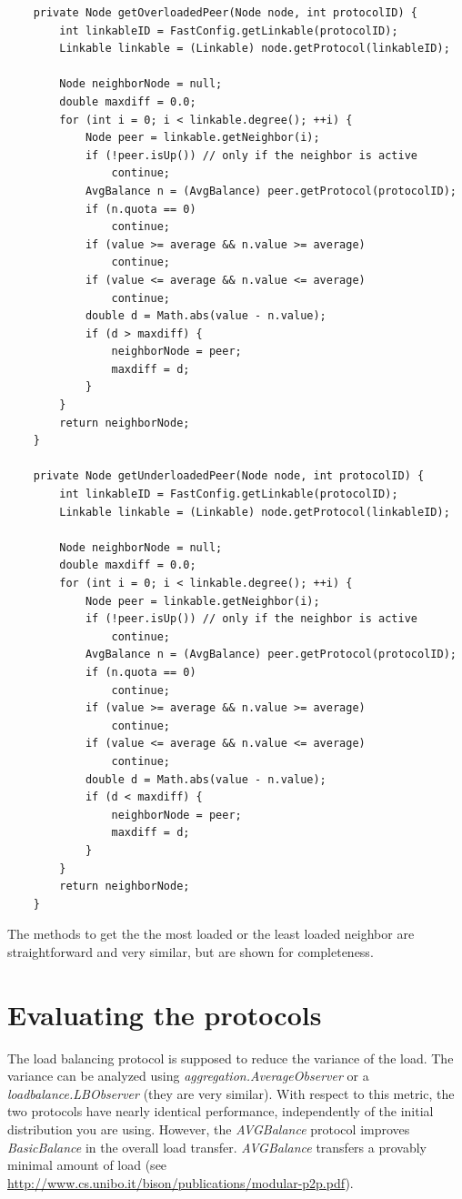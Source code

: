 \documentclass[a4paper,11pt]{article}
\begin{document}
\footnotesize
\begin{verbatim}
    private Node getOverloadedPeer(Node node, int protocolID) {
        int linkableID = FastConfig.getLinkable(protocolID);
        Linkable linkable = (Linkable) node.getProtocol(linkableID);

        Node neighborNode = null;
        double maxdiff = 0.0;
        for (int i = 0; i < linkable.degree(); ++i) {
            Node peer = linkable.getNeighbor(i);
            if (!peer.isUp()) // only if the neighbor is active
                continue;
            AvgBalance n = (AvgBalance) peer.getProtocol(protocolID);
            if (n.quota == 0)
                continue;
            if (value >= average && n.value >= average)
                continue;
            if (value <= average && n.value <= average)
                continue;
            double d = Math.abs(value - n.value);
            if (d > maxdiff) {
                neighborNode = peer;
                maxdiff = d;
            }
        }
        return neighborNode;
    }

    private Node getUnderloadedPeer(Node node, int protocolID) {
        int linkableID = FastConfig.getLinkable(protocolID);
        Linkable linkable = (Linkable) node.getProtocol(linkableID);

        Node neighborNode = null;
        double maxdiff = 0.0;
        for (int i = 0; i < linkable.degree(); ++i) {
            Node peer = linkable.getNeighbor(i);
            if (!peer.isUp()) // only if the neighbor is active
                continue;
            AvgBalance n = (AvgBalance) peer.getProtocol(protocolID);
            if (n.quota == 0)
                continue;
            if (value >= average && n.value >= average)
                continue;
            if (value <= average && n.value <= average)
                continue;
            double d = Math.abs(value - n.value);
            if (d < maxdiff) {
                neighborNode = peer;
                maxdiff = d;
            }
        }
        return neighborNode;
    }
\end{verbatim}
\normalsize
The methods to get the the most loaded or the least loaded neighbor
are straightforward and very similar, but are shown for completeness.


\section{Evaluating the protocols}

The load balancing protocol is supposed to reduce the variance of the load.
The variance can be analyzed using 
\emph{aggregation.AverageObserver} or a \emph{loadbalance.LBObserver}
(they are very similar).
With respect to this metric,
the two protocols have nearly identical
performance, independently of the initial distribution you are using.
However, the \emph{AVGBalance}
protocol improves \emph{BasicBalance} in the
overall load transfer. \emph{AVGBalance} transfers
a provably minimal amount of load
(see \url{http://www.cs.unibo.it/bison/publications/modular-p2p.pdf}). 
\end{document}
